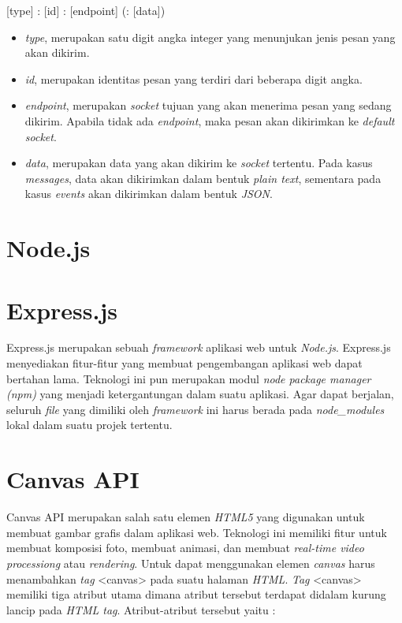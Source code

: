 [type] : [id] : [endpoint] (: [data])

\begin{itemize}
	\item \textit{type}, merupakan satu digit angka integer yang menunjukan jenis pesan yang akan dikirim.
	\item \textit{id}, merupakan identitas pesan yang terdiri dari beberapa digit angka.
	\item \textit{endpoint}, merupakan \textit{socket} tujuan yang akan menerima pesan yang sedang dikirim. Apabila tidak ada \textit{endpoint}, maka pesan akan dikirimkan ke \textit{default socket}.
	\item \textit{data}, merupakan data yang akan dikirim ke \textit{socket} tertentu. Pada kasus \textit{messages}, data akan dikirimkan dalam bentuk \textit{plain text}, sementara pada kasus \textit{events} akan dikirimkan dalam bentuk \textit{JSON}.
\end{itemize}

\section{Node.js}
\label{sec:Node.js}




\section{Express.js}
\label{sec:Express.js}

Express.js merupakan sebuah \textit{framework} aplikasi web untuk \textit{Node.js}. Express.js menyediakan fitur-fitur yang membuat pengembangan aplikasi web dapat bertahan lama. Teknologi ini pun merupakan modul \textit{node package manager (npm)} yang menjadi ketergantungan dalam suatu aplikasi. Agar dapat berjalan, seluruh \textit{file} yang dimiliki oleh \textit{framework} ini harus berada pada \textit{node\_modules} lokal dalam suatu projek tertentu. 


\section{Canvas API}
\label{sec:Canvas API}
 
Canvas API merupakan salah satu elemen \textit{HTML5} yang digunakan untuk membuat gambar grafis dalam aplikasi web. Teknologi ini memiliki fitur untuk membuat komposisi foto, membuat animasi, dan membuat \textit{real-time video processiong} atau \textit{rendering}. Untuk dapat menggunakan elemen \textit{canvas} harus menambahkan \textit{tag} <canvas> pada suatu halaman \textit{HTML}. \textit{Tag} <canvas> memiliki tiga atribut utama dimana atribut tersebut terdapat didalam kurung lancip pada \textit{HTML tag}. Atribut-atribut tersebut yaitu : 

